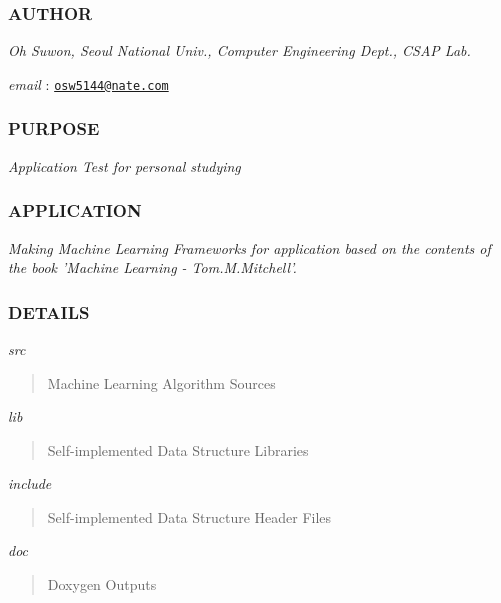 \subsubsection*{A\-U\-T\-H\-O\-R}

{\itshape Oh Suwon, Seoul National Univ., Computer Engineering Dept., C\-S\-A\-P Lab.}

{\itshape email} \-: \href{mailto:osw5144@nate.com}{\tt osw5144@nate.\-com}

\subsubsection*{P\-U\-R\-P\-O\-S\-E}

{\itshape Application Test for personal studying}

\subsubsection*{A\-P\-P\-L\-I\-C\-A\-T\-I\-O\-N}

{\itshape Making Machine Learning Frameworks for application based on the contents of the book 'Machine Learning -\/ Tom.\-M.\-Mitchell'.}

\subsubsection*{D\-E\-T\-A\-I\-L\-S}

{\itshape src} \begin{quotation}
Machine Learning Algorithm Sources

\end{quotation}
{\itshape lib} \begin{quotation}
Self-\/implemented Data Structure Libraries

\end{quotation}
{\itshape include} \begin{quotation}
Self-\/implemented Data Structure Header Files

\end{quotation}
{\itshape doc} \begin{quotation}
Doxygen Outputs \end{quotation}
